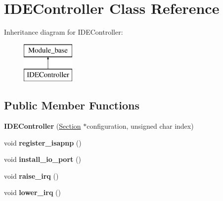 \hypertarget{classIDEController}{\section{I\-D\-E\-Controller Class Reference}
\label{classIDEController}
}
Inheritance diagram for I\-D\-E\-Controller\-:\begin{figure}[H]
\begin{center}
\leavevmode
\includegraphics[height=2.000000cm]{classIDEController}
\end{center}
\end{figure}
\subsection*{Public Member Functions}
\begin{DoxyCompactItemize}
\item 
\hypertarget{classIDEController_ac212220319dbe0384698e058854e4912}{{\bfseries I\-D\-E\-Controller} (\hyperlink{classSection}{Section} $\ast$configuration, unsigned char index)}\label{classIDEController_ac212220319dbe0384698e058854e4912}

\item 
\hypertarget{classIDEController_a7056ec2ed4d9c6c402b2f4e79f1c28c4}{void {\bfseries register\-\_\-isapnp} ()}\label{classIDEController_a7056ec2ed4d9c6c402b2f4e79f1c28c4}

\item 
\hypertarget{classIDEController_a6f388892e5565470829bb14e7f81acc8}{void {\bfseries install\-\_\-io\-\_\-port} ()}\label{classIDEController_a6f388892e5565470829bb14e7f81acc8}

\item 
\hypertarget{classIDEController_aab3392695b65aa87d9fbb592a830609d}{void {\bfseries raise\-\_\-irq} ()}\label{classIDEController_aab3392695b65aa87d9fbb592a830609d}

\item 
\hypertarget{classIDEController_af6d328472df95c4379ec37de893c3fcb}{void {\bfseries lower\-\_\-irq} ()}\label{classIDEController_af6d328472df95c4379ec37de893c3fcb}

\end{DoxyCompactItemize}
